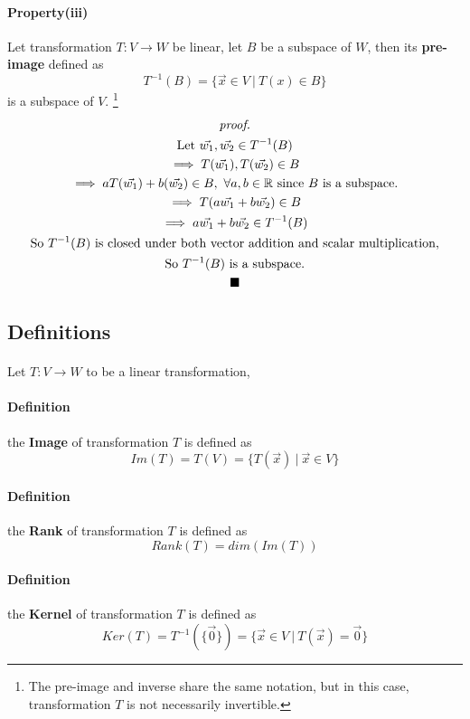 \documentclass[11pt]{article}
\begin{document}
	\paragraph{Property(iii)} Let transformation $T:V \to W$ be linear, let $B$ be a subspace of $W$, then its \textbf{pre-image} defined as
	\[
		T^{-1}(B) = \{\vec{x} \in V\ \vert\ T(x) \in B\}
	\]
	is a subspace of $V$. \footnote{The pre-image and inverse share the same notation, but in this case, transformation $T$ is not necessarily invertible.}
	\newpage
	\begin{multline*}
	\emph{proof.}\\
		\text{Let } \vec{w_1}, \vec{w_2} \in T^{-1}(B) \\
		\implies T(\vec{w_1}), T(\vec{w_2}) \in B \\
		\implies aT(\vec{w_1}) + b(\vec{w_2}) \in B,\ \forall a,b \in \mathbb{R} \text{ since $B$ is a subspace.} \\
		\implies T(a\vec{w_1} + b\vec{w_2}) \in B \\
		\implies a\vec{w_1} + b\vec{w_2} \in T^{-1}(B) \\
		\text{So $T^{-1}(B)$ is closed under both vector addition and scalar multiplication,} \\
		\text{So $T^{-1}(B)$ is a subspace.} \\
		\blacksquare
	\end{multline*}
	
	\subsection{Definitions}
	\paragraph{} Let $T: V \to W$ to be a linear transformation, 
	\paragraph{Definition} the \textbf{Image} of transformation $T$ is defined as
	\[
		Im(T) = T(V) = \{T(\vec{x})\ \vert\ \vec{x} \in V\}
	\]
	\paragraph{Definition} the \textbf{Rank} of transformation $T$ is defined as
	\[
		Rank(T) = dim(Im(T))
	\]
	\paragraph{Definition} the \textbf{Kernel} of transformation $T$ is defined as 
	\[
		Ker(T) = T^{-1}(\{\vec{0}\}) = \{\vec{x} \in V\ \vert\ T(\vec{x}) = \vec{0}\}
	\]
\end{document}
